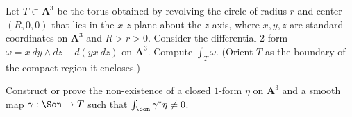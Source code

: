 \begin{alist}
\item Let $T\subset \mathbf{A}^3$ be the
torus obtained by revolving the circle of radius $r$ and center
$(R,0,0)$ that lies in the $x$-$z$-plane about the $z$ axis, where
$x,y,z$ are standard coordinates on $\mathbf{A}^3$ and
$R>r>0$. Consider the differential $2$-form $\omega=x \: dy\wedge
dz-d(yx\:dz)$ on $\mathbf{A}^3$. Compute $\int_T\omega$. (Orient $T$
as the boundary of the compact region it encloses.)
\item Construct or prove the non-existence of a closed $1$-form $\eta$
on $\mathbf{A}^3$ and a smooth map $\gamma:\Son\rightarrow T$ such
that $\int_{\Son}\gamma^*\eta\neq 0$.
\end{alist}
